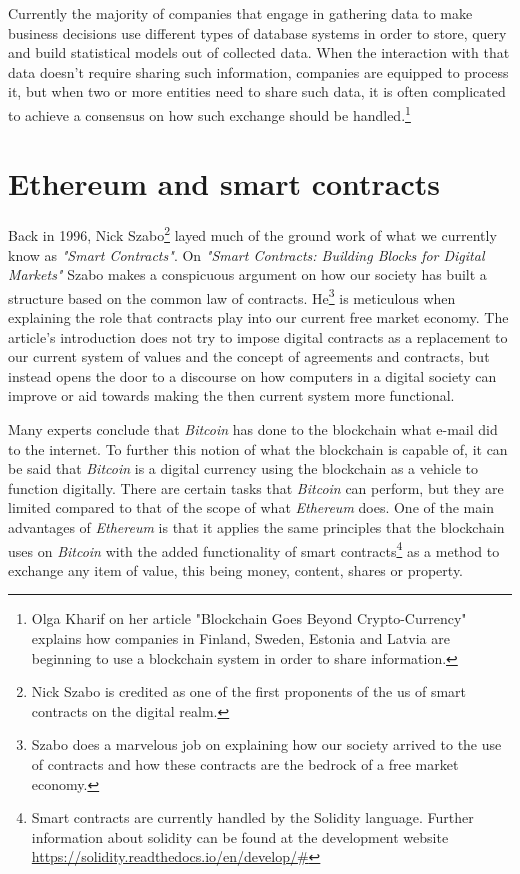 \documentclass[submission,copyright,creativecommons]{eptcs}
\begin{document}
Currently the majority of companies that engage in gathering data to make business decisions use different types of database systems in order to store, query and build statistical models out of collected data.  When the interaction with that data doesn't require sharing such information, companies are equipped to process it, but when two or more entities\cite{BlockchainGoesCryptoCurrency2016} need to share such data, it is often complicated to achieve a consensus on how such exchange should be handled.\footnote{Olga Kharif on her article "Blockchain Goes Beyond Crypto-Currency" explains how companies in Finland, Sweden, Estonia and Latvia are beginning to use a blockchain system in order to share information.}

\section{Ethereum and smart contracts}
Back in 1996, Nick Szabo\footnote{Nick Szabo is credited as one of the first proponents of the us of smart contracts on the digital realm.} layed much of the ground work of what we currently know as \textit{"Smart Contracts"}.  On \textit{"Smart Contracts: Building Blocks for Digital Markets"}\cite{NickSzaboSmart} Szabo makes a conspicuous argument on how our society has built a structure based on the common law of contracts.  He\footnote{Szabo does a marvelous job on explaining how our society arrived to the use of contracts and how these contracts are the bedrock of a free market economy.} is meticulous when explaining the role that contracts play into our current free market economy.  The article's introduction does not try to impose digital contracts as a replacement to our current system of values and the concept of agreements and contracts, but instead opens the door to a discourse on how computers in a digital society can improve or aid towards making the then current system more functional.

Many experts conclude that \textit{Bitcoin} has done to the blockchain what e-mail did to the internet.  To further this notion of what the blockchain is capable of, it can be said that \textit{Bitcoin} is a digital currency using the blockchain as a vehicle to function digitally.  There are certain tasks that \textit{Bitcoin} can perform, but they are limited compared to that of the scope of what \textit{Ethereum} does.  One of the main advantages of \textit{Ethereum} is that it applies the same principles that the blockchain uses on \textit{Bitcoin} with the added functionality of smart contracts\footnote{Smart contracts are currently handled by the Solidity language.  Further information about solidity can be found at the development website \url{https://solidity.readthedocs.io/en/develop/#}\cite{SoliditySolidity23}} as a method to exchange any item of value, this being money, content, shares or property.
\end{document}

